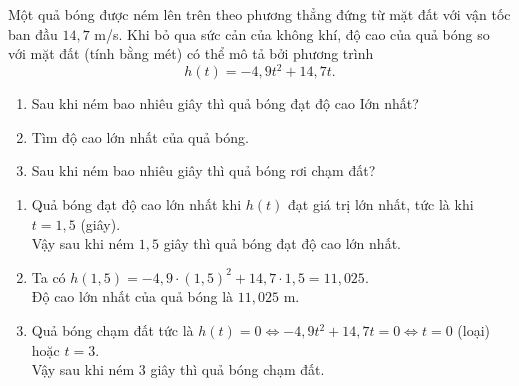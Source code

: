 \begin{bt}%
	Một quả bóng được ném lên trên theo phương thẳng đứng từ mặt đất với vận tốc ban đầu $14{,}7$ m/s. Khi bỏ qua sức cản của không khí, độ cao của quả bóng so với mặt đất (tính bằng mét) có thể mô tả bởi phương trình
	\[h(t)=-4{,}9 t^2+14{,}7 t.\]
	\begin{enumerate}
		\item Sau khi ném bao nhiêu giây thì quả bóng đạt độ cao Iớn nhất?
		\item Tìm độ cao lớn nhất của quả bóng.
		\item Sau khi ném bao nhiêu giây thì quả bóng rơi chạm đất?
	\end{enumerate}
	\loigiai
	{
		\begin{enumerate}
			\item Quả bóng đạt độ cao lớn nhất khi $h(t)$ đạt giá trị lớn nhất, tức là khi $t=1{,}5$ (giây).\\
			Vậy sau khi ném $1{,}5$ giây thì quả bóng đạt độ cao lớn nhất.
			\item Ta có $h(1{,}5)=-4{,}9 \cdot(1{,}5)^2+14{,}7 \cdot 1{,}5=11{,}025$.\\
			Độ cao lớn nhất của quả bóng là $11{,}025$ m.
			\item Quả bóng chạm đất tức là $h(t)=0 \Leftrightarrow -4{,}9 t^2+14{,}7 t=0 \Leftrightarrow t=0$ (loại) hoặc $t=3$.\\
			Vậy sau khi ném $3$ giây thì quả bóng chạm đất.
		\end{enumerate}
	}
\end{bt}


